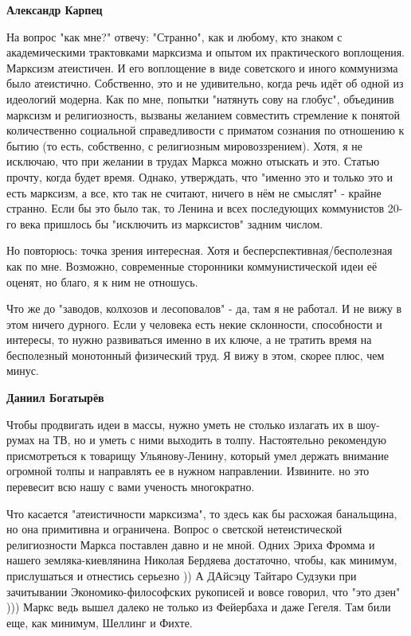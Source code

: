 \begin{itemize}
\begin{itemize}
\textbf{Александр Карпец} 

На вопрос "как мне?" отвечу: "Странно", как и любому, кто знаком с
академическими трактовками марксизма и опытом их практического воплощения.
Марксизм атеистичен. И его воплощение в виде советского и иного коммунизма было
атеистично. Собственно, это и не удивительно, когда речь идёт об одной из
идеологий модерна. Как по мне, попытки "натянуть сову на глобус", объединив
марксизм и религиозность, вызваны желанием совместить стремление к понятой
количественно социальной справедливости с приматом сознания по отношению к
бытию (то есть, собственно, с религиозным мировоззрением). Хотя, я не исключаю,
что при желании в трудах Маркса можно отыскать и это. Статью прочту, когда
будет время. Однако, утверждать, что "именно это и только это и есть марксизм,
а все, кто так не считают, ничего в нём не смыслят" - крайне странно. Если бы
это было так, то Ленина и всех последующих коммунистов 20-го века пришлось бы
"исключить из марксистов" задним числом.

Но повторюсь: точка зрения интересная. Хотя и бесперспективная/бесполезная как
по мне. Возможно, современные сторонники коммунистической идеи её оценят, но
благо, я к ним не отношусь.

Что же до "заводов, колхозов и лесоповалов" - да, там я не работал. И не вижу в
этом ничего дурного. Если у человека есть некие склонности, способности и
интересы, то нужно развиваться именно в их ключе, а не тратить время на
бесполезный монотонный физический труд. Я вижу в этом, скорее плюс, чем минус.

\textbf{Даниил Богатырёв} 

Чтобы продвигать идеи в массы, нужно уметь не столько излагать их в шоу-румах
на ТВ, но и уметь с ними выходить в толпу. Настоятельно рекомендую
присмотреться к товарищу Ульянову-Ленину, который умел держать внимание
огромной толпы и направлять ее в нужном направлении. Извините. но это перевесит
всю нашу с вами ученость многократно.

Что касается "атеистичности марксизма", то здесь как бы расхожая банальщина, но
она примитивна и ограничена. Вопрос о светской нетеистической религиозности
Маркса поставлен давно и не мной. Одних Эриха Фромма и нашего
земляка-киевлянина Николая Бердяева достаточно, чтобы, как минимум,
прислушаться и отнестись серьезно )) А ДАйсэцу Тайтаро Судзуки при зачитывании
Экономико-философских рукописей и вовсе говорил, что "это дзен" ))) Маркс ведь
вышел далеко не только из Фейербаха и даже Гегеля. Там били еще, как минимум,
Шеллинг и Фихте.


\end{itemize}
\end{itemize}

